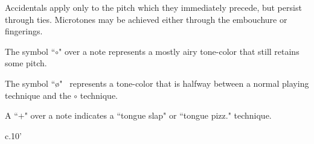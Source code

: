 \documentclass[10pt]{article}
\begin{document}
\begin{center}
Accidentals apply only to the pitch which they immediately precede, but persist through ties. Microtones may be achieved either through the embouchure or fingerings.
\end{center}

\begin{center}
The symbol ``$\circ$" over a note represents a mostly airy tone-color that still retains some pitch.
\end{center}

\begin{center}
The symbol ``\o" \ represents a tone-color that is halfway between a normal playing technique and the $\circ$ technique.
\end{center}

\begin{center}
A ``$+$" over a note indicates a ``tongue slap" or ``tongue pizz." technique.
\end{center}

\vspace*{0.3\baselineskip}

\begin{center}
c.10'
\end{center}
\end{document}
